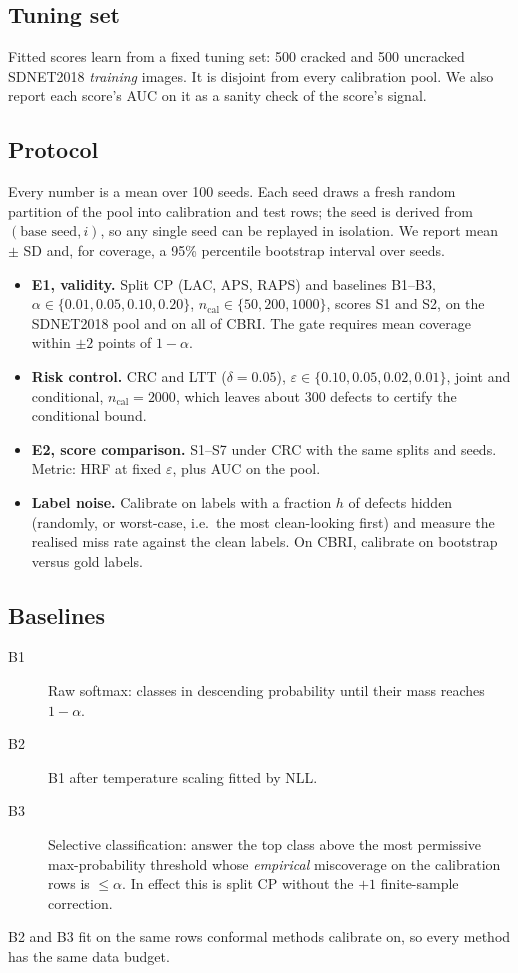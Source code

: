 \subsection{Tuning set}

Fitted scores learn from a fixed tuning set: 500 cracked and 500 uncracked
SDNET2018 \emph{training} images. It is disjoint from every calibration
pool. We also report each score's AUC on it as a sanity check of the
score's signal.

\subsection{Protocol}

Every number is a mean over 100 seeds. Each seed draws a fresh random
partition of the pool into calibration and test rows; the seed is derived
from $(\text{base seed}, i)$, so any single seed can be replayed in
isolation. We report mean $\pm$ SD and, for coverage, a 95\% percentile
bootstrap interval over seeds.

\begin{itemize}
  \item \textbf{E1, validity.} Split CP (LAC, APS, RAPS) and baselines
  B1--B3, $\alpha \in \{0.01, 0.05, 0.10, 0.20\}$, $n_{\text{cal}} \in \{50,
  200, 1000\}$, scores S1 and S2, on the SDNET2018 pool and on all of CBRI.
  The gate requires mean coverage within $\pm 2$ points of $1-\alpha$.
  \item \textbf{Risk control.} CRC and LTT ($\delta = 0.05$),
  $\varepsilon \in \{0.10, 0.05, 0.02, 0.01\}$, joint and conditional,
  $n_{\text{cal}} = 2000$, which leaves about 300 defects to certify the
  conditional bound.
  \item \textbf{E2, score comparison.} S1--S7 under CRC with the same
  splits and seeds. Metric: HRF at fixed $\varepsilon$, plus AUC on the
  pool.
  \item \textbf{Label noise.} Calibrate on labels with a fraction $h$ of
  defects hidden (randomly, or worst-case, i.e.\ the most clean-looking
  first) and measure the realised miss rate against the clean labels. On
  CBRI, calibrate on bootstrap versus gold labels.
\end{itemize}

\subsection{Baselines}

\begin{description}
  \item[B1] Raw softmax: classes in descending probability until their
  mass reaches $1-\alpha$.
  \item[B2] B1 after temperature scaling fitted by NLL.
  \item[B3] Selective classification: answer the top class above the
  most permissive max-probability threshold whose \emph{empirical}
  miscoverage on the calibration rows is $\le\alpha$. In effect this is split
  CP without the $+1$ finite-sample correction.
\end{description}
B2 and B3 fit on the same rows conformal methods calibrate on, so every
method has the same data budget.

